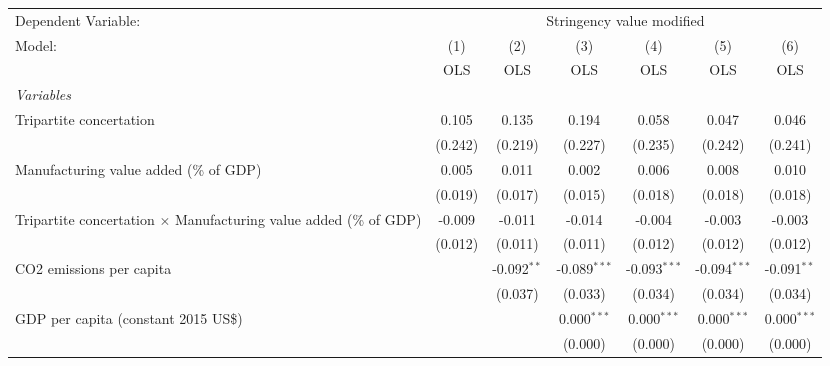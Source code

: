 
\begingroup
\centering
\begin{tabular}{lcccccc}
   \toprule
   Dependent Variable: & \multicolumn{6}{c}{Stringency value modified}\\
   Model:                                                                   & (1)     & (2)           & (3)            & (4)            & (5)            & (6)\\  
                                                                            &  OLS    & OLS           & OLS            & OLS            & OLS            & OLS\\  
   \midrule
   \emph{Variables}\\
   Tripartite concertation                                                  & 0.105   & 0.135         & 0.194          & 0.058          & 0.047          & 0.046\\   
                                                                            & (0.242) & (0.219)       & (0.227)        & (0.235)        & (0.242)        & (0.241)\\   
   Manufacturing value added (\% of GDP)                                    & 0.005   & 0.011         & 0.002          & 0.006          & 0.008          & 0.010\\   
                                                                            & (0.019) & (0.017)       & (0.015)        & (0.018)        & (0.018)        & (0.018)\\   
   Tripartite concertation $\times$ Manufacturing value added (\% of GDP)   & -0.009  & -0.011        & -0.014         & -0.004         & -0.003         & -0.003\\   
                                                                            & (0.012) & (0.011)       & (0.011)        & (0.012)        & (0.012)        & (0.012)\\   
   CO2 emissions per capita                                                 &         & -0.092$^{**}$ & -0.089$^{***}$ & -0.093$^{***}$ & -0.094$^{***}$ & -0.091$^{**}$\\   
                                                                            &         & (0.037)       & (0.033)        & (0.034)        & (0.034)        & (0.034)\\   
   GDP per capita (constant 2015 US\$)                                      &         &               & 0.000$^{***}$  & 0.000$^{***}$  & 0.000$^{***}$  & 0.000$^{***}$\\   
                                                                            &         &               & (0.000)        & (0.000)        & (0.000)        & (0.000)\\   

\end{tabular}
